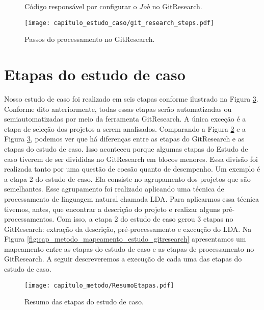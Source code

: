  \begin{figure}[H]
  \centering
  \caption{Código responsável por configurar o \textit{Job} no GitResearch.}
  \label{fig:configuracao_job} 
\end{figure}
 
 


 \begin{figure}[H]
  \centering
  \texttt{[image: capitulo\_estudo\_caso/git\_research\_steps.pdf]} 
  \caption{Passos do processamento no GitResearch.}
  \label{fig:passos_gitresearch} 
\end{figure}



\section{Etapas do estudo de caso}

Nosso estudo de caso foi realizado em seis etapas conforme ilustrado na Figura \ref{fig:cap_metodo_resumo_etapas}. Conforme dito anteriormente, todas essas etapas serão automatizadas ou semiautomatizadas por meio da ferramenta GitResearch. A única exceção é a etapa de seleção dos projetos a serem analisados.  Comparando a Figura \ref{fig:passos_gitresearch} e a Figura \ref{fig:cap_metodo_resumo_etapas}, podemos ver que há diferenças entre as etapas do GitResearch e as etapas do estudo de caso. Isso aconteceu porque algumas etapas do Estudo de caso tiverem de ser divididas no GitResearch em blocos menores. Essa divisão foi realizada tanto por uma questão de coesão quanto de desempenho. Um exemplo é a etapa 2 do estudo de caso. Ela consiste no agrupamento dos projetos que são semelhantes. Esse agrupamento foi realizado aplicando uma técnica de processamento de linguagem natural chamada LDA. Para aplicarmos essa técnica tivemos, antes, que encontrar a descrição do projeto e realizar alguns pré-processamentos. Com isso, a etapa 2 do estudo de caso gerou 3 etapas no GitResearch: extração da descrição, pré-processamento e execução do LDA. Na Figura \ref{fig:cap_metodo_mapeamento_estudo_gitresearch} apresentamos um mapeamento entre as etapas do estudo de caso e as etapas de processamento no GitResearch. A seguir descreveremos a execução de cada uma das etapas do estudo de caso. 






  \begin{figure}[H]
  \centering
  \texttt{[image: capitulo\_metodo/ResumoEtapas.pdf]} 
  \caption{Resumo das etapas do estudo de caso. }
  \label{fig:cap_metodo_resumo_etapas} 
\end{figure}

